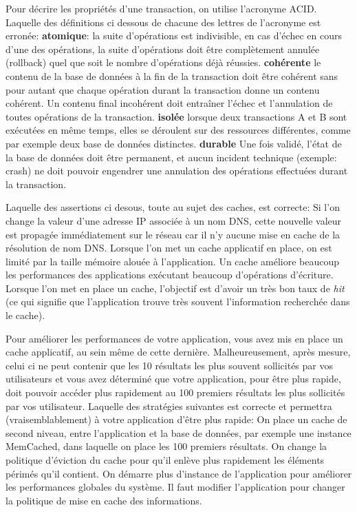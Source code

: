\documentclass[a4paper,10pt]{article}
\begin{document}
\begin{question}{Pour décrire les propriétés d'une transaction, on utilise l'acronyme ACID. Laquelle
des définitions ci dessous de chacune des lettres de l'acronyme est erronée:}
  \true \textbf{atomique}: la suite d'opérations est indivisible, en cas d'échec en cours
  d'une des opérations, la suite d'opérations doit être complètement annulée (rollback) quel que
  soit le nombre d'opérations déjà réussies.
  \true \textbf{cohérente} le contenu de la base de données à la fin de la transaction doit être
  cohérent sans pour autant que chaque opération durant la transaction donne un contenu cohérent.
  Un contenu final incohérent doit entraîner l'échec et l'annulation de toutes opérations de la
  transaction.
  \false \textbf{isolée} lorsque deux transactions A et B sont exécutées en même temps, elles se
  déroulent sur des ressources différentes, comme par exemple deux base de données distinctes.
  \true \textbf{durable} Une fois validé, l'état de la base de données doit être permanent, et aucun
  incident technique (exemple: crash) ne doit pouvoir engendrer une annulation des opérations
  effectuées durant la transaction.
\end{question}

\begin{question}{Laquelle des assertions ci desous, toute au sujet des caches, est correcte:}
  \false Si l'on change la valeur d'une adresse IP associée à un nom DNS, cette nouvelle valeur est
  propagée immédiatement sur le réseau car il n'y aucune mise en cache de la résolution de nom DNS.
  \false Lorsque l'on met un cache applicatif en place, on est limité par la taille mémoire alouée
  à l'application. %
  \false Un cache améliore beaucoup les performances des applications exécutant beaucoup
  d'opérations d'écriture.
  \true Lorsque l'on met en place un cache, l'objectif est d'avoir un très bon taux de \textit{hit}
  (ce qui signifie que l'application trouve très souvent l'information recherchée dans le cache).
\end{question}

\begin{question}{Pour améliorer les performances de votre application, vous avez mis en place un
cache applicatif, au sein même de cette dernière. Malheureusement, après mesure, celui ci ne peut
contenir que les 10 résultats les plus souvent sollicités par vos utilisateurs et vous avez
déterminé que votre application, pour être plus rapide, doit pouvoir accéder plus rapidement au 100
premiers résultats les plus sollicités par vos utilisateur. Laquelle des stratégies suivantes est
correcte et permettra (vraisemblablement) à votre application d'être plus rapide:}
  \true On place un cache de second niveau, entre l'application et la base de données, par exemple
  une instance MemCached, dans laquelle on place les 100 premiers résultats.
  \false On change la politique d'éviction du cache pour qu'il enlève plus rapidement les éléments
  périmés qu'il contient.
  \false On démarre plus d'instance de l'application pour améliorer les performances globales du
  système.
  \false Il faut modifier l'application pour changer la politique de mise en cache des informations.
\end{question}
\end{document}
